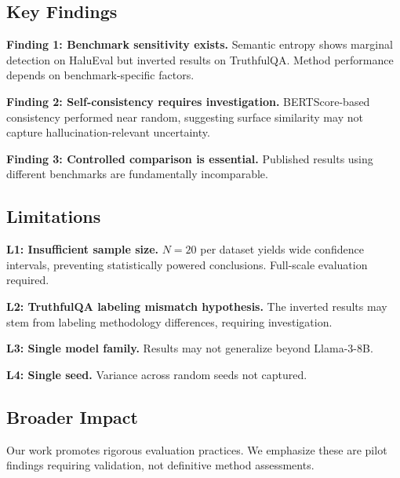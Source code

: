 \subsection{Key Findings}

\textbf{Finding 1: Benchmark sensitivity exists.} Semantic entropy shows marginal detection on HaluEval but inverted results on TruthfulQA. Method performance depends on benchmark-specific factors.

\textbf{Finding 2: Self-consistency requires investigation.} BERTScore-based consistency performed near random, suggesting surface similarity may not capture hallucination-relevant uncertainty.

\textbf{Finding 3: Controlled comparison is essential.} Published results using different benchmarks are fundamentally incomparable.

\subsection{Limitations}

\textbf{L1: Insufficient sample size.} $N=20$ per dataset yields wide confidence intervals, preventing statistically powered conclusions. Full-scale evaluation required.

\textbf{L2: TruthfulQA labeling mismatch hypothesis.} The inverted results may stem from labeling methodology differences, requiring investigation.

\textbf{L3: Single model family.} Results may not generalize beyond Llama-3-8B.

\textbf{L4: Single seed.} Variance across random seeds not captured.

\subsection{Broader Impact}

Our work promotes rigorous evaluation practices. We emphasize these are pilot findings requiring validation, not definitive method assessments.
